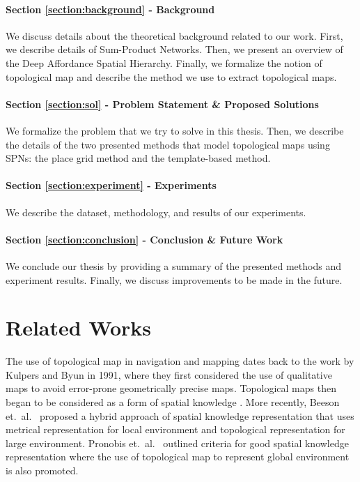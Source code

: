 \documentclass[10pt, titlepage]{article}
\theoremstyle{definition}
\begin{document}
\paragraph{Section \ref{section:background} - Background} We discuss details about the theoretical background related to our work. First, we describe details of Sum-Product Networks. Then, we present an overview of the Deep Affordance Spatial Hierarchy. Finally, we formalize the notion of topological map and describe the method we use to extract topological maps.

\paragraph{Section \ref{section:sol} - Problem Statement \& Proposed Solutions} We formalize the problem that we try to solve in this thesis. Then, we describe the details of the two presented methods that model topological maps using SPNs: the place grid method and the template-based method.

\paragraph{Section \ref{section:experiment} - Experiments} We describe the dataset, methodology, and results of our experiments.

\paragraph{Section \ref{section:conclusion} - Conclusion \& Future Work} We conclude our thesis by providing a summary of the presented methods and experiment results. Finally, we discuss improvements to be made in the future.


\newpage
\section{Related Works}\label{section:related}

The use of topological map in navigation and mapping dates back to the work by Kulpers and Byun \cite{kuipers1991robot} in 1991, where they first considered the use of qualitative maps to avoid error-prone geometrically precise maps. Topological maps then began to be considered as a form of spatial knowledge \cite{kuipers2000spatial}. More recently, Beeson et.~al.~\cite{beeson2010factoring} proposed a hybrid approach of spatial knowledge representation that uses metrical representation for local environment and topological representation for large environment. Pronobis et.~al.~\cite{pronobis2010representing} outlined criteria for good spatial knowledge representation where the use of topological map to represent global environment is also promoted.
\end{document}
